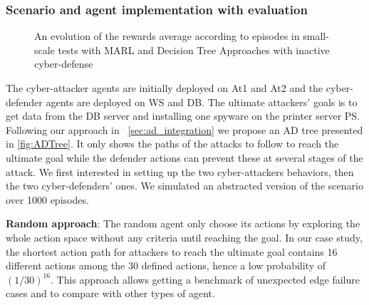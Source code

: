 


\subsubsection{Scenario and agent implementation with evaluation}

\begin{figure}
    \centering
    
    \caption{An evolution of the rewards average according to episodes in small-scale tests with MARL and Decision Tree Approaches with inactive cyber-defense
    }
    \label{fig:graphs}
\end{figure}

\noindent
The cyber-attacker agents are initially deployed on At1 and At2 and the cyber-defender agents are deployed on WS and DB. The ultimate attackers' goals is to get data from the DB server and installing one spyware on the printer server PS. Following our approach in ~\autoref{sec:ad_integration} we propose an AD tree presented in \autoref{fig:ADTree}. It only shows the paths of the attacks to follow to reach the ultimate goal while the defender actions can prevent these at several stages of the attack.
We first interested in setting up the two cyber-attackers behaviors, then the two cyber-defenders' ones. We simulated an abstracted version of the scenario over 1000 episodes.




\noindent
\textbf{Random approach}: \quad The random agent only choose its actions by exploring the whole action space without any criteria until reaching the goal. In our case study, the shortest action path for attackers to reach the ultimate goal contains 16 different actions among the 30 defined actions, hence a low probability of $(1/30)^{16}$.
This approach allows getting a benchmark of unexpected edge failure cases and to compare with other types of agent.

